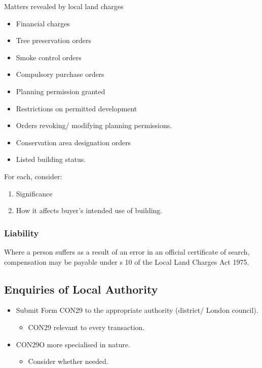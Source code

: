 \documentclass[
]{article}
\providecommand{\tightlist}{%
  \setlength{\itemsep}{0pt}\setlength{\parskip}{0pt}}
\newenvironment{env-c75278ec-0f81-4db3-97b1-0452147ba646}
{
    \savenotes\tcolorbox[blanker,breakable,left=5pt,borderline west={2pt}{-4pt}{purple}]
}
{
    \endtcolorbox\spewnotes
}
\begin{document}
\begin{env-c75278ec-0f81-4db3-97b1-0452147ba646}

Matters revealed by local land charges

\begin{itemize}
\tightlist
\item
  Financial charges
\item
  Tree preservation orders
\item
  Smoke control orders
\item
  Compulsory purchase orders
\item
  Planning permission granted
\item
  Restrictions on permitted development
\item
  Orders revoking/ modifying planning permissions.
\item
  Conservation area designation orders
\item
  Listed building status.
\end{itemize}

\end{env-c75278ec-0f81-4db3-97b1-0452147ba646}

For each, consider:

\begin{enumerate}
\tightlist
\item
  Significance
\item
  How it affects buyer's intended use of building.
\end{enumerate}

\hypertarget{liability}{%
\subsubsection{Liability}\label{liability}}

Where a person suffers as a result of an error in an official
certificate of search, compensation may be payable under s 10 of the
Local Land Charges Act 1975.

\hypertarget{enquiries-of-local-authority}{%
\subsection{Enquiries of Local
Authority}\label{enquiries-of-local-authority}}

\begin{itemize}
\tightlist
\item
  Submit Form CON29 to the appropriate authority (district/ London
  council).

  \begin{itemize}
  \tightlist
  \item
    CON29 relevant to every transaction.
  \end{itemize}
\item
  CON29O more specialised in nature.

  \begin{itemize}
  \tightlist
  \item
    Consider whether needed.
  \end{itemize}
\end{itemize}
\end{document}
